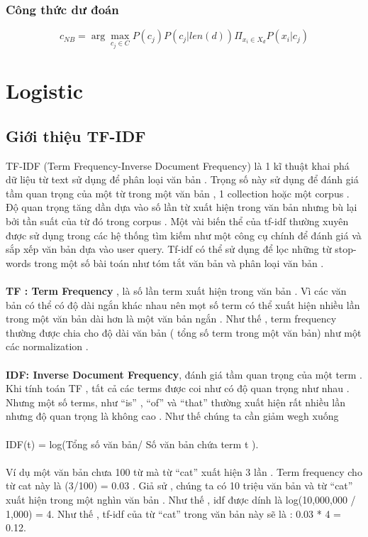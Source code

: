 \documentclass[a4paper,11pt]{report}
\begin{document}
\subsection{Công thức dư đoán}
\begin{displaymath}
\displaystyle c_{NB} = \arg\max_{c_j\in C}P(c_j)P(c_j|len(d))\Pi_{x_i \in X_d}P(x_i|c_j)
\end{displaymath}
\chapter{Logistic}
\section{Giới thiệu TF-IDF}
TF-IDF (Term Frequency-Inverse Document Frequency) là 1 kĩ thuật khai phá dữ liệu từ text sử dụng để phân loại văn bản . Trọng số này sử dụng để đánh giá tầm quan trọng của một từ trong một văn bản , 1 collection hoặc một corpus . Độ quan trọng tăng dần dựa vào số lần từ xuất hiện trong văn bản nhưng bù lại bởi tần suất của từ đó trong corpus . Một vài biến thể của tf-idf thường xuyên được sử dụng trong các hệ thống tìm kiếm như một công cụ chính để đánh giá và sắp xếp văn bản dựa vào user query. Tf-idf có thể sử dụng để lọc những từ stop-words trong một số bài toán như tóm tắt văn bản và phân loại văn bản . \\ \\
\textbf{TF : Term Frequency} , là số lần term xuất hiện trong văn bản . Vì các văn bản có thể có độ dài ngắn khác nhau nên mọt số term có thể xuất hiện nhiều lần trong một văn bản dài hơn là một văn bản ngắn . Như thế , term frequency thường được chia cho độ dài văn bản ( tổng số term trong một văn bản) như một các normalization . \\ \\
\textbf{IDF: Inverse Document Frequency}, đánh giá tầm quan trọng của một term . Khi tính toán TF , tất cả các terms được coi như có độ quan trọng như nhau . Nhưng một số terms, như “is” , “of” và “that” thường xuất hiện rất nhiều lần nhưng độ quan trọng là không cao . Như thế chúng ta cần giảm wegh xuống \\ \\
IDF(t) = log(Tổng số văn bản/ Số văn bản chứa term t ). \\  \\
Ví dụ một văn bản chưa 100 từ mà từ “cat” xuất hiện 3 lần . Term frequency cho từ cat này là (3/100) = 0.03 . Giả sử , chúng ta có 10 triệu văn bản và từ “cat” xuất hiện trong một nghìn văn bản . Như thế , idf được dính là log(10,000,000 / 1,000) = 4. Như thế , tf-idf của từ “cat” trong văn bản này sẽ là : 0.03 * 4 = 0.12. \\
\end{document}
